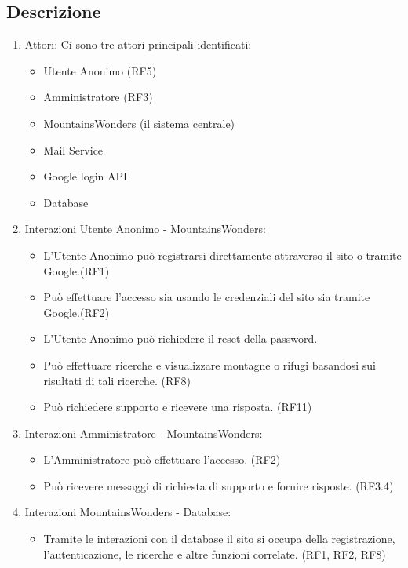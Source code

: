 \documentclass[a4paper,12pt]{article}
\begin{document}
\subsection{Descrizione}

\begin{enumerate}
    \item Attori: Ci sono tre attori principali identificati:
    \begin{itemize}
        \item Utente Anonimo (RF5)
        \item Amministratore (RF3)
        \item MountainsWonders (il sistema centrale)
        \item Mail Service
        \item Google login API 
        \item Database
    \end{itemize}
    
    \item Interazioni Utente Anonimo - MountainsWonders:  
    \begin{itemize}
        \item L'Utente Anonimo può registrarsi direttamente attraverso il sito o tramite Google.(RF1) 
        \item Può effettuare l'accesso sia usando le credenziali del sito sia tramite Google.(RF2)
        \item L'Utente Anonimo può richiedere il reset della password.
        \item Può effettuare ricerche e visualizzare montagne o rifugi basandosi sui risultati di tali ricerche. (RF8)
        \item Può richiedere supporto e ricevere una risposta. (RF11)
    \end{itemize}
    
    \item Interazioni Amministratore - MountainsWonders:
    \begin{itemize}
        \item L'Amministratore può effettuare l'accesso. (RF2)
        \item Può ricevere messaggi di richiesta di supporto e fornire risposte. (RF3.4)
    \end{itemize}
    
    \item Interazioni MountainsWonders - Database:
    \begin{itemize}
        \item Tramite le interazioni con il database il sito si occupa della registrazione, l'autenticazione, le ricerche e altre funzioni correlate. (RF1, RF2, RF8)
    \end{itemize}
    

\end{enumerate}
\end{document}
